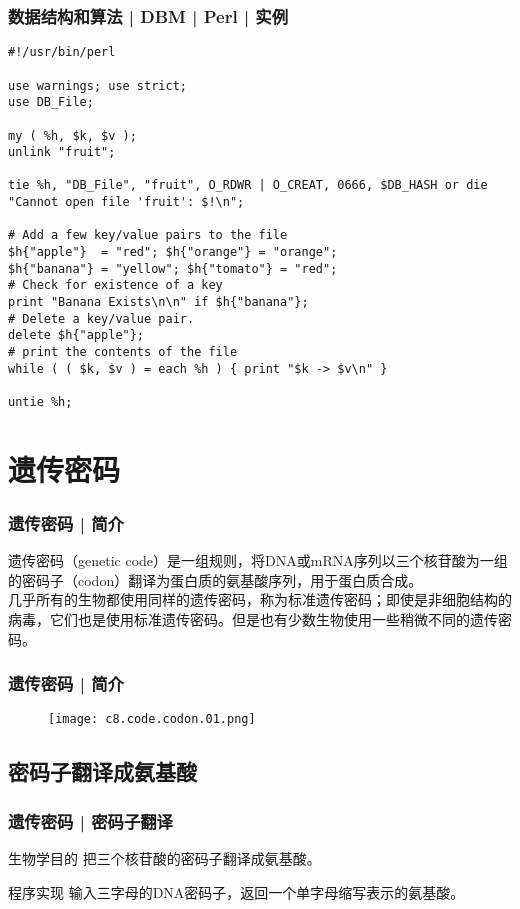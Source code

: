 \begin{frame}[fragile]
  \frametitle{数据结构和算法 | DBM | Perl | 实例}
\begin{lstlisting}[basicstyle=\scriptsize\tt,numberstyle=\scriptsize]
#!/usr/bin/perl

use warnings; use strict;
use DB_File;

my ( %h, $k, $v );
unlink "fruit";

tie %h, "DB_File", "fruit", O_RDWR | O_CREAT, 0666, $DB_HASH or die "Cannot open file 'fruit': $!\n";

# Add a few key/value pairs to the file
$h{"apple"}  = "red"; $h{"orange"} = "orange";
$h{"banana"} = "yellow"; $h{"tomato"} = "red";
# Check for existence of a key
print "Banana Exists\n\n" if $h{"banana"};
# Delete a key/value pair.
delete $h{"apple"};
# print the contents of the file
while ( ( $k, $v ) = each %h ) { print "$k -> $v\n" }

untie %h;
\end{lstlisting}
\end{frame}

\section{遗传密码}
\begin{frame}
  \frametitle{遗传密码 | 简介}
  遗传密码（genetic code）是一组规则，将DNA或mRNA序列以三个核苷酸为一组的密码子（codon）翻译为蛋白质的氨基酸序列，用于蛋白质合成。\\
  \vspace{1em}
  几乎所有的生物都使用同样的遗传密码，称为标准遗传密码；即使是非细胞结构的病毒，它们也是使用标准遗传密码。但是也有少数生物使用一些稍微不同的遗传密码。
\end{frame}

\begin{frame}
  \frametitle{遗传密码 | 简介}
  \begin{figure}
    \centering
    \texttt{[image: c8.code.codon.01.png]}
  \end{figure}
\end{frame}

\subsection{密码子翻译成氨基酸}
\begin{frame}
  \frametitle{遗传密码 | 密码子翻译}
  \begin{block}{生物学目的}
 把三个核苷酸的密码子翻译成氨基酸。 
  \end{block}
  \pause
  \begin{block}{程序实现}
    输入三字母的DNA密码子，返回一个单字母缩写表示的氨基酸。
  \end{block}
\end{frame}

